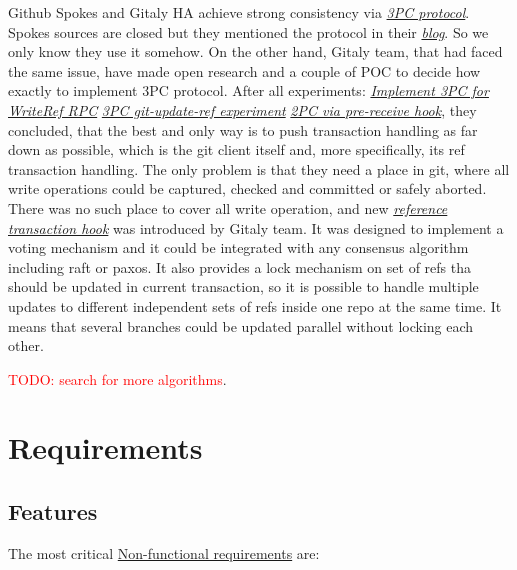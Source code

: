 \documentclass[acmlarge, screen, nonacm, 11pt]{acmart}
\newcommand{\todo}[1]{\textcolor{red}{TODO: #1}}
\begin{document}
Github Spokes and Gitaly HA achieve strong consistency via \emph{\href{https://en.wikipedia.org/wiki/Three-phase_commit_protocol}{3PC protocol}}.
Spokes sources are closed but they mentioned the protocol in their \emph{\href{https://github.blog/2017-10-13-stretching-spokes/\#reducing-round-trips}{blog}}.
So we only know they use it somehow.
On the other hand, Gitaly team, that had faced the same issue, have made open research and a couple of POC to decide how exactly to implement 3PC protocol.
After all experiments:
\emph{\href{https://gitlab.com/gitlab-org/gitaly/-/issues/2466}{Implement 3PC for WriteRef RPC}}
\emph{\href{https://gitlab.com/gitlab-org/gitaly/-/issues/2529}{3PC git-update-ref experiment}}
\emph{\href{https://gitlab.com/gitlab-org/gitaly/-/issues/2635}{2PC via pre-receive hook}},
  they concluded, that the best and only way is to push transaction handling as far down as possible, which is the git client itself and, more specifically, its ref transaction handling.
The only problem is that they need a place in git, where all write operations could be captured, checked and committed or safely aborted.
There was no such place to cover all write operation, and new
\emph{\href{https://github.com/git/git/commit/675415976704459edaf8fb39a176be2be0f403d8}{reference transaction hook}}
was introduced by Gitaly team.
It was designed to implement a voting mechanism and it could be integrated with any consensus algorithm including raft or paxos.
It also provides a lock mechanism on set of refs tha should be updated in current transaction, so it is possible to handle multiple updates to different independent sets of refs inside one repo at the same time.
It means that several branches could be updated parallel without locking each other.

\todo{search for more algorithms}.



\section{Requirements}
\label{sec:requirements}

\subsection{Features}
\label{sec:features}

The most critical
\href{https://en.wikipedia.org/wiki/Non-functional_requirement}{Non-functional requirements}
are:
\end{document}
